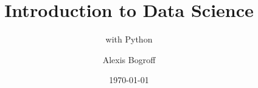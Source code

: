 



\title{Introduction to Data Science}
\subtitle{with Python}
\author{Alexis Bogroff}
\date{\today}
